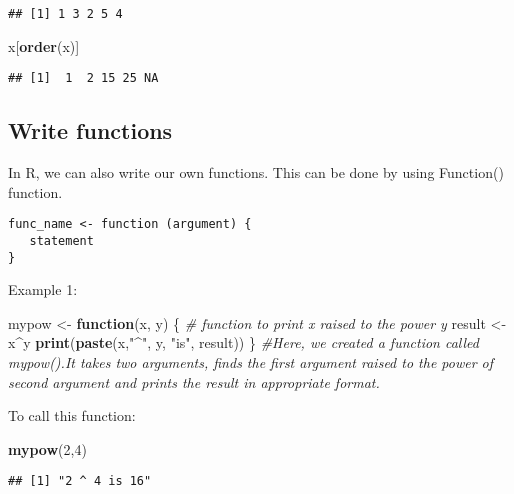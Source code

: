 \documentclass[]{book}
\newenvironment{Shaded}{\begin{snugshade}}{\end{snugshade}}
\newcommand{\KeywordTok}[1]{\textcolor[rgb]{0.13,0.29,0.53}{\textbf{#1}}}
\newcommand{\DecValTok}[1]{\textcolor[rgb]{0.00,0.00,0.81}{#1}}
\newcommand{\StringTok}[1]{\textcolor[rgb]{0.31,0.60,0.02}{#1}}
\newcommand{\CommentTok}[1]{\textcolor[rgb]{0.56,0.35,0.01}{\textit{#1}}}
\newcommand{\ControlFlowTok}[1]{\textcolor[rgb]{0.13,0.29,0.53}{\textbf{#1}}}
\newcommand{\OperatorTok}[1]{\textcolor[rgb]{0.81,0.36,0.00}{\textbf{#1}}}
\newcommand{\NormalTok}[1]{#1}
\theoremstyle{definition}
\theoremstyle{definition}
\theoremstyle{definition}
\theoremstyle{remark}
\begin{document}
\begin{verbatim}
## [1] 1 3 2 5 4
\end{verbatim}

\begin{Shaded}
\begin{Highlighting}[]
\NormalTok{x[}\KeywordTok{order}\NormalTok{(x)]}
\end{Highlighting}
\end{Shaded}

\begin{verbatim}
## [1]  1  2 15 25 NA
\end{verbatim}

\subsection{Write functions}\label{write-functions}

In R, we can also write our own functions. This can be done by using
Function() function.

\begin{verbatim}
func_name <- function (argument) {
   statement
}
\end{verbatim}

Example 1:

\begin{Shaded}
\begin{Highlighting}[]
\NormalTok{mypow <-}\StringTok{ }\ControlFlowTok{function}\NormalTok{(x, y) \{}
   \CommentTok{# function to print x raised to the power y}
\NormalTok{   result <-}\StringTok{ }\NormalTok{x}\OperatorTok{^}\NormalTok{y}
   \KeywordTok{print}\NormalTok{(}\KeywordTok{paste}\NormalTok{(x,}\StringTok{"^"}\NormalTok{, y, }\StringTok{"is"}\NormalTok{, result))}
\NormalTok{\}}
\CommentTok{#Here, we created a function called mypow().It takes two arguments, finds the first argument raised to the power of second argument and prints the result in appropriate format.}
\end{Highlighting}
\end{Shaded}

To call this function:

\begin{Shaded}
\begin{Highlighting}[]
\KeywordTok{mypow}\NormalTok{(}\DecValTok{2}\NormalTok{,}\DecValTok{4}\NormalTok{)}
\end{Highlighting}
\end{Shaded}

\begin{verbatim}
## [1] "2 ^ 4 is 16"
\end{verbatim}
\end{document}
